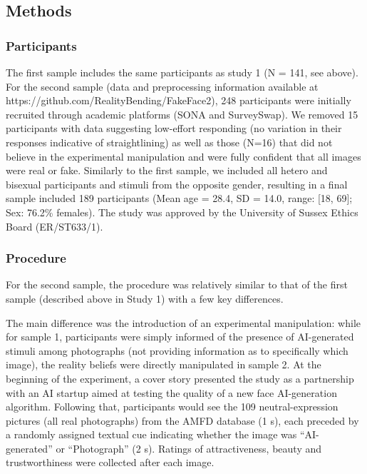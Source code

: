 \documentclass[
  jou,
  floatsintext,
  longtable,
  nolmodern,
  notxfonts,
  notimes,
  colorlinks=true,linkcolor=blue,citecolor=blue,urlcolor=blue]{apa7}
\begin{document}
\subsection{Methods}\label{methods-1}

\subsubsection{Participants}\label{participants-1}

The first sample includes the same participants as study 1 (N = 141, see
above). For the second sample (data and preprocessing information
available at https://github.com/RealityBending/FakeFace2), 248
participants were initially recruited through academic platforms (SONA
and SurveySwap). We removed 15 participants with data suggesting
low-effort responding (no variation in their responses indicative of
straightlining) as well as those (N=16) that did not believe in the
experimental manipulation and were fully confident that all images were
real or fake. Similarly to the first sample, we included all hetero and
bisexual participants and stimuli from the opposite gender, resulting in
a final sample included 189 participants (Mean age = 28.4, SD = 14.0,
range: {[}18, 69{]}; Sex: 76.2\% females). The study was approved by the
University of Sussex Ethics Board (ER/ST633/1).

\subsubsection{Procedure}\label{procedure-1}

For the second sample, the procedure was relatively similar to that of
the first sample (described above in Study 1) with a few key
differences.

The main difference was the introduction of an experimental
manipulation: while for sample 1, participants were simply informed of
the presence of AI-generated stimuli among photographs (not providing
information as to specifically which image), the reality beliefs were
directly manipulated in sample 2. At the beginning of the experiment, a
cover story presented the study as a partnership with an AI startup
aimed at testing the quality of a new face AI-generation algorithm.
Following that, participants would see the 109 neutral-expression
pictures (all real photographs) from the AMFD database (1 s), each
preceded by a randomly assigned textual cue indicating whether the image
was ``AI-generated'' or ``Photograph'' (2 s). Ratings of attractiveness,
beauty and trustworthiness were collected after each image.
\end{document}
